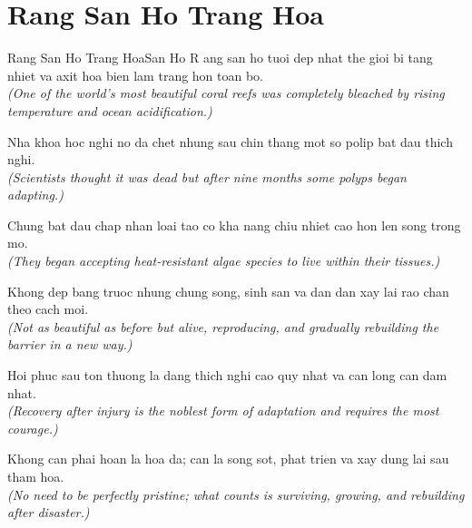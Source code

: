 \section{Rang San Ho Trang Hoa}
\begin{truyen}{Rang San Ho Trang Hoa}{San Ho}
R ang san ho tuoi dep nhat the gioi bi tang nhiet va axit hoa bien lam trang hon toan bo.\\
\textit{(One of the world's most beautiful coral reefs was completely bleached by rising temperature and ocean acidification.)}

Nha khoa hoc nghi no da chet nhung sau chin thang mot so polip bat dau thich nghi.\\
\textit{(Scientists thought it was dead but after nine months some polyps began adapting.)}

Chung bat dau chap nhan loai tao co kha nang chiu nhiet cao hon len song trong mo.\\
\textit{(They began accepting heat-resistant algae species to live within their tissues.)}

Khong dep bang truoc nhung chung song, sinh san va dan dan xay lai rao chan theo cach moi.\\
\textit{(Not as beautiful as before but alive, reproducing, and gradually rebuilding the barrier in a new way.)}

Hoi phuc sau ton thuong la dang thich nghi cao quy nhat va can long can dam nhat.\\
\textit{(Recovery after injury is the noblest form of adaptation and requires the most courage.)}

\end{truyen}
\begin{baihoc}
  Khong can phai hoan la hoa da; can la song sot, phat trien va xay dung lai sau tham hoa.\\
  \textit{(No need to be perfectly pristine; what counts is surviving, growing, and rebuilding after disaster.)}
\end{baihoc}

